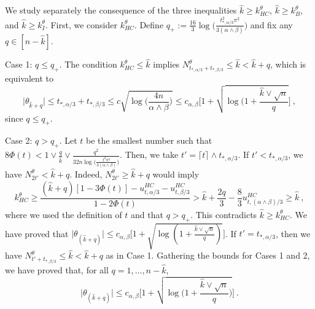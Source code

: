 \documentclass[twoside,11pt]{article}
\def\beq{\begin{equation}}
\def\eeq{\end{equation}}
\newcommand{\<}{\langle}
\renewcommand{\>}{\rangle}
\begin{document}
We study separately the consequence of the three inequalities $\widehat{k}\geq k^{\theta}_{HC}$,  $\widehat{k}\geq k^{\theta}_{B}$, and  $\widehat{k}\geq k^{\theta}_{I}$. First, we consider $k^{\theta}_{HC}$. Define $q_+:= \frac{16}{3}\log\big(\frac{t_{*,\alpha/3}^2\pi^2}{3(\alpha\wedge \beta)}\big)$ and fix any $q\in [n-\widehat{k}]$.

\noindent
Case 1: $q\leq q_+$. The condition $k^{\theta}_{HC}\leq \widehat{k}$ implies $N^{\theta}_{t_{*,\alpha/3}+t_{*,\beta/3}}\leq \widehat{k} < \widehat{k}+q$, which is equivalent to 
\[
 \big|\theta_{\widehat{k}+q}\big|\leq t_{*,\alpha/3}+t_{*,\beta/3}\leq c\sqrt{\log\big(\frac{4n}{\alpha\wedge \beta}\big)}\leq c_{\alpha,\beta}\Big[1+\sqrt{\log(1+\frac{\widehat{k}\vee \sqrt{n}}{q}}\Big]\ ,
\]
since $q\leq q_+$.
\medskip

\noindent 
Case 2: $q>q_+$. Let $t$ be the smallest number such that $8\Phi(t)< 1\vee \frac{q}{\widehat{k}}\vee \frac{q^2}{32n\log\big(\frac{t^2\pi^2}{3(\alpha\wedge \beta)}\big)}$. Then, we take $t'=\lceil t\rceil\wedge t_{*,\alpha/3}$. If $t' < t_{*,\alpha/3}$, we have $N^{\theta}_{2t'}< \widehat{k}+q$. Indeed, $N^{\theta}_{2t'}\geq  \widehat{k}+q$ would imply
\[
k^{\theta}_{HC} \geq \frac{(\widehat{k}+q)[1-3\Phi(t)]-u_{t,\alpha/3}^{HC}-u_{t,\beta/3}^{HC}}{1-2\Phi(t)}> \widehat{k} + \frac{2q}{3}- \frac{8}{3}u_{t,(\alpha\wedge \beta)/3}^{HC}\geq \widehat{k}\ ,
\]
where we used the definition of $t$ and that  $q>q_+$. This contradicts $\widehat{k}\geq k^{\theta}_{HC}$. We have proved that 
$\big|\theta_{(\widehat{k}+q)}\big|\leq c_{\alpha,\beta}\big[1+\sqrt{\log(1+\frac{\widehat{k}\vee \sqrt{n}}{q})}\big]$. If $t'= t_{*,\alpha/3}$, then we have 
$N_{t'+t_{*,\beta/3}}^{\theta}\leq \widehat{k} < \widehat{k}+q$ as in Case 1. Gathering the bounds for Cases 1 and 2, we have proved that, for all $q=1,\ldots , n-\widehat{k}$, 
\beq\label{eq:puissance_estim_HC}
\big|\theta_{(\widehat{k}+q)}\big|\leq c_{\alpha,\beta}\Big[1+\sqrt{\log\Big(1+\frac{\widehat{k}\vee \sqrt{n}}{q}\Big)}\Big]\ .
\eeq

\bigskip 
\end{document}
